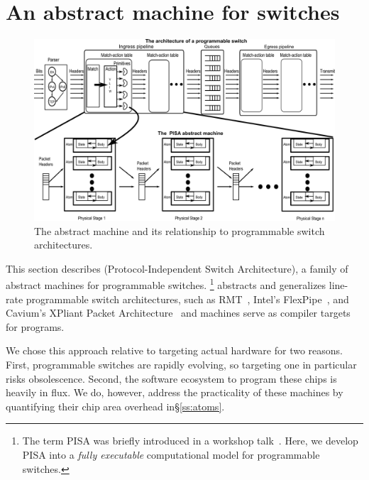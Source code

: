 \section{An abstract machine for switches}
\label{s:absmachine}

\begin{figure}[!t]
  \includegraphics[width=\textwidth]{pisa.pdf}
  \caption{The \absmachine abstract machine and its relationship to
  programmable switch architectures.}
  \label{fig:switch}
\end{figure}

This section describes \absmachine (Protocol-Independent Switch Architecture),
a family of abstract machines for programmable switches.  \footnote{The term
  PISA was briefly introduced in a workshop talk~\cite{nick_p4}.  Here, we
  develop PISA into a \textit{fully executable} computational model for
programmable switches.} \absmachine abstracts and generalizes line-rate
programmable switch architectures, such as RMT~\cite{rmt}, Intel's
FlexPipe~\cite{flexpipe}, and Cavium's XPliant Packet
Architecture~\cite{xpliant} and \absmachine machines serve as compiler targets
for \pktlanguage programs.

We chose this approach relative to targeting actual hardware for two reasons.
First, programmable switches are rapidly evolving, so targeting one in
particular risks obsolescence. Second, the software ecosystem to program these
chips is heavily in flux. We do, however, address the practicality of these
\absmachine machines by quantifying their chip area overhead in\S\ref{ss:atoms}.

